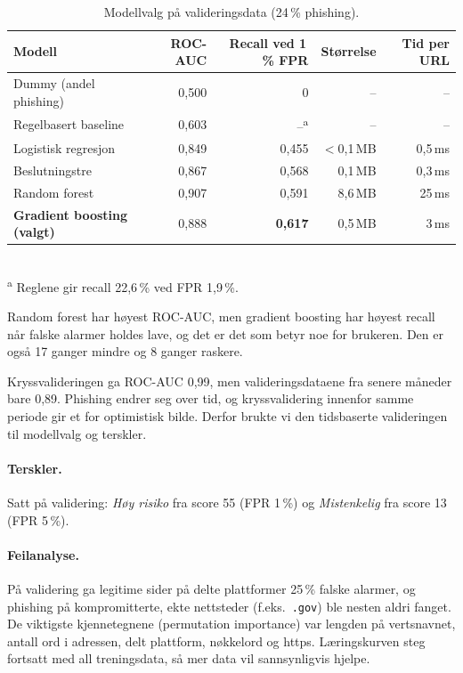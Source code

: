 \documentclass[11pt,a4paper]{article}
\newcommand{\code}[1]{\texttt{#1}}
\begin{document}
\begin{table}[H]
\centering
\small
\caption{Modellvalg på valideringsdata (24\,\% phishing).}\label{tab:modellvalg}
\begin{tabular}{lrrrr}
\toprule
Modell & ROC-AUC & Recall ved 1\,\% FPR & Størrelse & Tid per URL \\
\midrule
Dummy (andel phishing) & 0,500 & 0 & -- & -- \\
Regelbasert baseline & 0,603 & --\textsuperscript{a} & -- & -- \\
Logistisk regresjon & 0,849 & 0,455 & $<$0,1\,MB & 0,5\,ms \\
Beslutningstre & 0,867 & 0,568 & 0,1\,MB & 0,3\,ms \\
Random forest & 0,907 & 0,591 & 8,6\,MB & 25\,ms \\
\textbf{Gradient boosting (valgt)} & 0,888 & \textbf{0,617} & 0,5\,MB & 3\,ms \\
\bottomrule
\end{tabular}\\[2pt]
\footnotesize\textsuperscript{a} Reglene gir recall 22,6\,\% ved FPR 1,9\,\%.
\end{table}

Random forest har høyest ROC-AUC, men gradient boosting har høyest recall når falske alarmer holdes lave, og det er det som betyr noe for brukeren. Den er også 17 ganger mindre og 8 ganger raskere.

Kryssvalideringen ga ROC-AUC 0,99, men valideringsdataene fra senere måneder bare 0,89. Phishing endrer seg over tid, og kryssvalidering innenfor samme periode gir et for optimistisk bilde. Derfor brukte vi den tidsbaserte valideringen til modellvalg og terskler.

\paragraph{Terskler.} Satt på validering: \emph{Høy risiko} fra score 55 (FPR 1\,\%) og \emph{Mistenkelig} fra score 13 (FPR 5\,\%).

\paragraph{Feilanalyse.} På validering ga legitime sider på delte plattformer 25\,\% falske alarmer, og phishing på kompromitterte, ekte nettsteder (f.eks.\ \code{.gov}) ble nesten aldri fanget. De viktigste kjennetegnene (permutation importance) var lengden på vertsnavnet, antall ord i adressen, delt plattform, nøkkelord og https. Læringskurven steg fortsatt med all treningsdata, så mer data vil sannsynligvis hjelpe.
\end{document}
